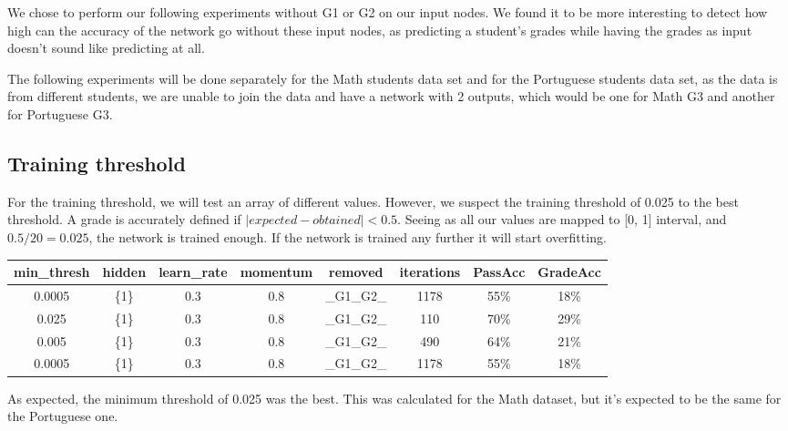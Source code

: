 \documentclass[11pt]{article}
\begin{document}
We chose to perform our following experiments without G1 or G2 on our input nodes. We found it to be more interesting to detect how high can the accuracy of the network go without these input nodes, as predicting a student's grades while having the grades as input doesn't sound like predicting at all.

The following experiments will be done separately for the Math students data set and for the Portuguese students data set, as the data is from different students, we are unable to join the data and have a network with 2 outputs, which would be one for Math G3 and another for Portuguese G3.
\subsection{Training threshold}
For the training threshold, we will test an array of different values. However, we suspect the training threshold of 0.025 to the best threshold. A grade is accurately defined if $|expected - obtained| < 0.5$. Seeing as all our values are mapped to [0, 1] interval, and $0.5 / 20 = 0.025$, the network is trained enough. If the network is trained any further it will start overfitting.

\begin{tabular}{| c | c | c | c | c | c | c | c |}
\hline \textbf{min\_thresh} & \textbf{hidden} & \textbf{learn\_rate} & \textbf{momentum} & \textbf{removed} & \textbf{iterations} & \textbf{PassAcc} & \textbf{GradeAcc}\\
\hline 0.0005 & \{1\} & 0.3 & 0.8 & \_G1\_G2\_ & 1178 & 55\% & 18\%\\
\hline 0.025 & \{1\} & 0.3 & 0.8 & \_G1\_G2\_ & 110 & 70\% & 29\%\\
\hline 0.005 & \{1\} & 0.3 & 0.8 & \_G1\_G2\_ & 490 & 64\% & 21\%\\
\hline 0.0005 & \{1\} & 0.3 & 0.8 & \_G1\_G2\_ & 1178 & 55\% & 18\%\\
\hline
\end{tabular}

As expected, the minimum threshold of 0.025 was the best. This was calculated for the Math dataset, but it's expected to be the same for the Portuguese one.
\end{document}
